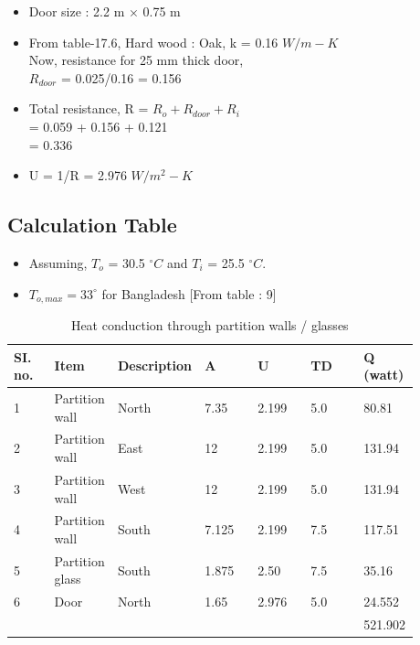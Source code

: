 \documentclass{article}
\begin{document}
  \begin{itemize}
    \item Door size : 2.2 m $\times$ 0.75 m 
    \item From table-17.6, Hard wood : Oak, k = 0.16 $W/m-K$\\
    Now, resistance for 25 mm thick door,\\ $R_{door}$ = 0.025/0.16 = 0.156 
    \item Total resistance, R = $R_o + R_{door} + R_i$ \\= 0.059 + 0.156 + 0.121 \\= 0.336 
    \item U = 1/R = 2.976 $W/m^2-K$ 
  \end{itemize}

  \vspace{0.5cm}
  \subsection{Calculation Table}

  \begin{itemize}
    \item Assuming, $T_o$ = 30.5 $^{\circ}C$ and $T_i$ = 25.5 $^{\circ}C$. 
    \item $T_{o,max} = 33^{\circ}$ for Bangladesh [From table : 9]
  \end{itemize}
  \begin{table}[ht]
    \centering
    \begin{adjustbox}{width=\textwidth}
    \begin{tabularx}{\linewidth}{p{0.10\linewidth} p{0.13\linewidth} p{0.13\linewidth} p{0.13\linewidth} p{0.13\linewidth} p{0.13\linewidth} p{0.13\linewidth}}
        \hline
        SI. no. & Item & Description & A & U & TD & Q (watt) \\
        \hline
        1 & Partition wall & North & 7.35 & 2.199 & 5.0 & 80.81 \\
        2 & Partition wall & East & 12 & 2.199 & 5.0 & 131.94 \\
        3 & Partition wall & West & 12 & 2.199 & 5.0 & 131.94 \\
        4 & Partition wall & South & 7.125 & 2.199 & 7.5 & 117.51 \\
        5 & Partition glass & South & 1.875 & 2.50 & 7.5 & 35.16 \\
        6 & Door & North & 1.65 & 2.976 & 5.0 & 24.552 \\
        \hline
        &&&&&& 521.902 \\
        \hline
    \end{tabularx}
    \end{adjustbox}
    \caption{Heat conduction through partition walls / glasses}
    \label{tab:heat conduction through partition walls / glasses}
    \end{table}
    \vspace*{1cm}
\end{document}
